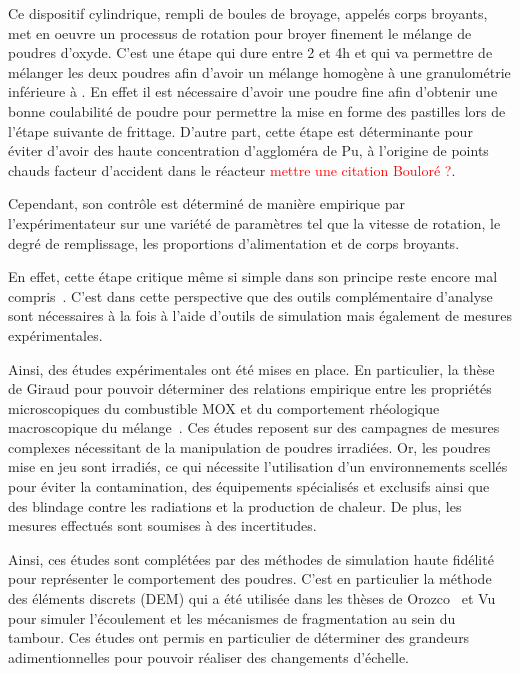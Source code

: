 Ce dispositif cylindrique, rempli de boules de broyage, appelés corps broyants, met en oeuvre un processus de rotation pour broyer finement le mélange de poudres d'oxyde. C'est une étape qui dure entre 2 et 4h et qui va permettre de mélanger les deux poudres afin d'avoir un mélange homogène à une granulométrie inférieure à . En effet il est nécessaire d'avoir une poudre fine afin d'obtenir une bonne coulabilité de poudre pour permettre la mise en forme des pastilles lors de l'étape suivante de frittage. D'autre part, cette étape est déterminante pour éviter d'avoir des haute concentration d'aggloméra de Pu, à l'origine de points chauds facteur d'accident dans le réacteur \textcolor{red}{mettre une citation Bouloré ?}.

Cependant, son contrôle est déterminé de manière empirique par l'expérimentateur sur une variété de paramètres tel que la vitesse de rotation, le degré de remplissage, les proportions d'alimentation et de corps broyants.

En effet, cette étape critique même si simple dans son principe reste encore mal compris~\cite{Austin1981,Brandao2020,Mankosa1986,Datta2002,Capece2014}. C'est dans cette perspective que des outils complémentaire d'analyse sont nécessaires à la fois à l'aide d'outils de simulation mais également de mesures expérimentales.

Ainsi, des études expérimentales ont été mises en place. En particulier, la thèse de Giraud pour pouvoir déterminer des relations empirique entre les propriétés microscopiques du combustible MOX et du comportement rhéologique macroscopique du mélange~\cite{giraud_analyse_2020}. Ces études reposent sur des campagnes de mesures complexes nécessitant de la manipulation de poudres irradiées. Or, les poudres mise en jeu sont irradiés, ce qui nécessite l'utilisation d'un environnements scellés pour éviter la contamination, des équipements spécialisés et exclusifs ainsi que des blindage contre les radiations et la production de chaleur. De plus, les mesures effectués sont soumises à des incertitudes.

Ainsi, ces études sont complétées par des méthodes de simulation haute fidélité pour représenter le comportement des poudres. C'est en particulier la méthode des éléments discrets (DEM) qui a été utilisée dans les thèses de Orozco~\cite{Orozco2019} et Vu~\cite{vu_quasi-static_2023} pour simuler l'écoulement et les mécanismes de fragmentation au sein du tambour. Ces études ont permis en particulier de déterminer des grandeurs adimentionnelles pour pouvoir réaliser des changements d'échelle. %

